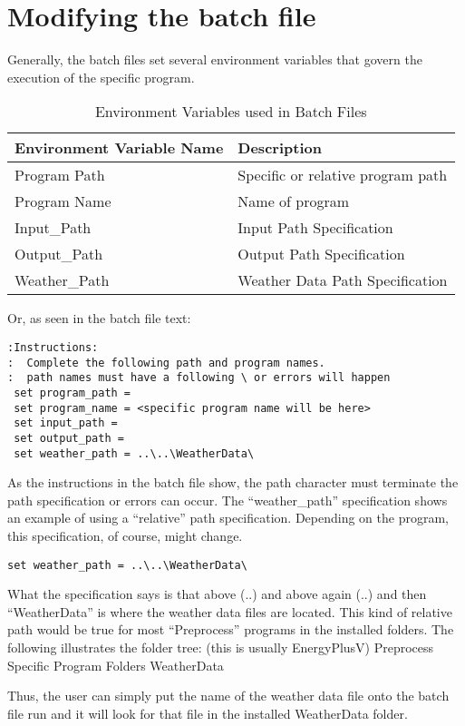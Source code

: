 \section{Modifying the batch file}\label{modifying-the-batch-file}

Generally, the batch files set several environment variables that govern the execution of the specific program.

\begin{longtable}[c]{@{}ll@{}}
\caption{Environment Variables used in Batch Files \protect \label{table:environment-variables-used-in-batch-files}}\\
\toprule 
Environment Variable Name & Description \tabularnewline \midrule
\endhead
Program Path & Specific or relative program path \tabularnewline
Program Name & Name of program \tabularnewline
Input\_Path & Input Path Specification \tabularnewline
Output\_Path & Output Path Specification \tabularnewline
Weather\_Path & Weather Data Path Specification \tabularnewline
\bottomrule
\end{longtable}

Or, as seen in the batch file text:

\begin{lstlisting}
:Instructions:
:  Complete the following path and program names.
:  path names must have a following \ or errors will happen
 set program_path =
 set program_name = <specific program name will be here>
 set input_path =
 set output_path =
 set weather_path = ..\..\WeatherData\
\end{lstlisting}

As the instructions in the batch file show, the path character must terminate the path specification or errors can occur. The ``weather\_path'' specification shows an example of using a ``relative'' path specification. Depending on the program, this specification, of course, might change.

\begin{lstlisting}
set weather_path = ..\..\WeatherData\
\end{lstlisting}

What the specification says is that above (..) and above again (..) and then ``WeatherData'' is where the weather data files are located. This kind of relative path would be true for most ``Preprocess'' programs in the installed folders. The following illustrates the folder tree: (this is usually EnergyPlusV) Preprocess Specific Program Folders WeatherData

Thus, the user can simply put the name of the weather data file onto the batch file run and it will look for that file in the installed WeatherData folder.
